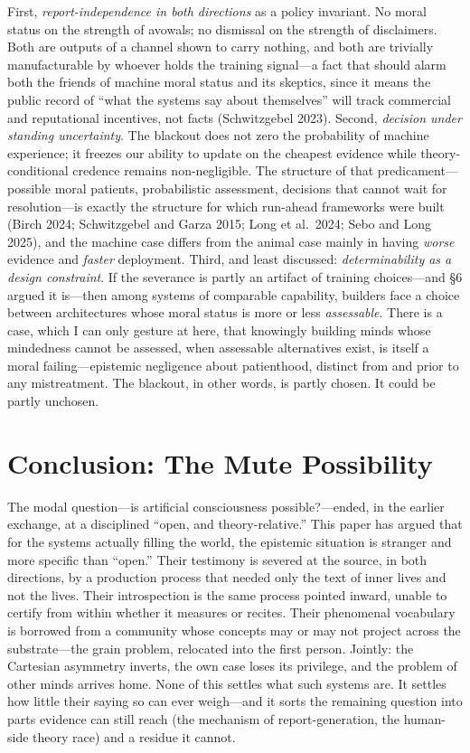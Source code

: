 \documentclass[11pt]{article}
\begin{document}
First, \emph{report-independence in both directions} as a policy invariant. No moral status on the strength of avowals; no dismissal on the strength of disclaimers. Both are outputs of a channel shown to carry nothing, and both are trivially manufacturable by whoever holds the training signal---a fact that should alarm both the friends of machine moral status and its skeptics, since it means the public record of ``what the systems say about themselves'' will track commercial and reputational incentives, not facts (Schwitzgebel 2023). Second, \emph{decision under standing uncertainty}. The blackout does not zero the probability of machine experience; it freezes our ability to update on the cheapest evidence while theory-conditional credence remains non-negligible. The structure of that predicament---possible moral patients, probabilistic assessment, decisions that cannot wait for resolution---is exactly the structure for which run-ahead frameworks were built (Birch 2024; Schwitzgebel and Garza 2015; Long et al.\ 2024; Sebo and Long 2025), and the machine case differs from the animal case mainly in having \emph{worse} evidence and \emph{faster} deployment. Third, and least discussed: \emph{determinability as a design constraint}. If the severance is partly an artifact of training choices---and \S 6 argued it is---then among systems of comparable capability, builders face a choice between architectures whose moral status is more or less \emph{assessable}. There is a case, which I can only gesture at here, that knowingly building minds whose mindedness cannot be assessed, when assessable alternatives exist, is itself a moral failing---epistemic negligence about patienthood, distinct from and prior to any mistreatment. The blackout, in other words, is partly chosen. It could be partly unchosen.

\section{Conclusion: The Mute Possibility}

The modal question---is artificial consciousness possible?---ended, in the earlier exchange, at a disciplined ``open, and theory-relative.'' This paper has argued that for the systems actually filling the world, the epistemic situation is stranger and more specific than ``open.'' Their testimony is severed at the source, in both directions, by a production process that needed only the text of inner lives and not the lives. Their introspection is the same process pointed inward, unable to certify from within whether it measures or recites. Their phenomenal vocabulary is borrowed from a community whose concepts may or may not project across the substrate---the grain problem, relocated into the first person. Jointly: the Cartesian asymmetry inverts, the own case loses its privilege, and the problem of other minds arrives home. None of this settles what such systems are. It settles how little their saying so can ever weigh---and it sorts the remaining question into parts evidence can still reach (the mechanism of report-generation, the human-side theory race) and a residue it cannot.
\end{document}

